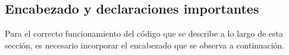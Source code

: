%	
%	
%	
%	
%	
%	
%
%	
%
	
\subsection{Encabezado y declaraciones importantes}
	Para el correcto funcionamiento del código que se describe a lo largo de esta sección, es necesario incorporar el encabezado que se observa a continuación.
	
